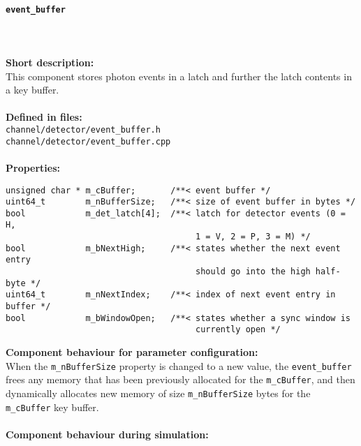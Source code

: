 \paragraph{\texttt{event\_buffer}}
\label{par:comp_detector_evb}
\noindent \\
\\
\textbf{Short description:}\\
This component stores photon events in a latch and further the latch contents in a key buffer.\\
\\
\textbf{Defined in files:}\\
\texttt{channel/detector/event\_buffer.h}\\
\texttt{channel/detector/event\_buffer.cpp}\\
\\
\textbf{Properties:}
\begin{lstlisting}
unsigned char * m_cBuffer;       /**< event buffer */
uint64_t        m_nBufferSize;   /**< size of event buffer in bytes */
bool            m_det_latch[4];  /**< latch for detector events (0 = H, 
                                      1 = V, 2 = P, 3 = M) */
bool            m_bNextHigh;     /**< states whether the next event entry
                                      should go into the high half-byte */
uint64_t        m_nNextIndex;    /**< index of next event entry in buffer */
bool            m_bWindowOpen;   /**< states whether a sync window is
                                      currently open */
\end{lstlisting}
\noindent
\textbf{Component behaviour for parameter configuration:}\\
When the \texttt{m\_nBufferSize} property is changed to a new value, the \texttt{event\_buffer} frees any memory that has been previously allocated for the \texttt{m\_cBuffer}, and then dynamically allocates new memory of size \texttt{m\_nBufferSize} bytes for the \texttt{m\_cBuffer} key buffer.\\
\\
\noindent
\textbf{Component behaviour during simulation:}\\
